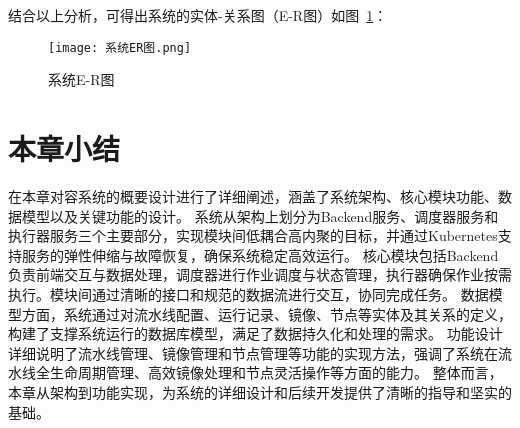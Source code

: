 结合以上分析，可得出系统的实体-关系图（E-R图）如图~\ref{fig:系统E-R图}：

\begin{figure}[h]
  \centering
  \texttt{[image: 系统ER图.png]}
  \caption{系统E-R图}
  \label{fig:系统E-R图}
\end{figure}

\section{本章小结}

在本章对容系统的概要设计进行了详细阐述，涵盖了系统架构、核心模块功能、数据模型以及关键功能的设计。
系统从架构上划分为Backend服务、调度器服务和执行器服务三个主要部分，实现模块间低耦合高内聚的目标，并通过Kubernetes支持服务的弹性伸缩与故障恢复，确保系统稳定高效运行。
核心模块包括Backend负责前端交互与数据处理，调度器进行作业调度与状态管理，执行器确保作业按需执行。模块间通过清晰的接口和规范的数据流进行交互，协同完成任务。
数据模型方面，系统通过对流水线配置、运行记录、镜像、节点等实体及其关系的定义，构建了支撑系统运行的数据库模型，满足了数据持久化和处理的需求。
功能设计详细说明了流水线管理、镜像管理和节点管理等功能的实现方法，强调了系统在流水线全生命周期管理、高效镜像处理和节点灵活操作等方面的能力。
整体而言，本章从架构到功能实现，为系统的详细设计和后续开发提供了清晰的指导和坚实的基础。